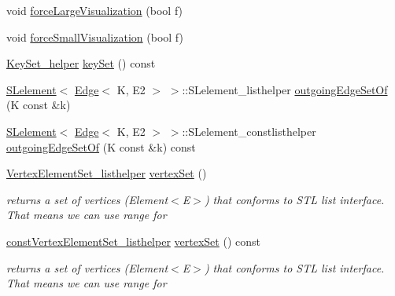 \begin{DoxyCompactItemize}
\item 
void \mbox{\hyperlink{classbridges_1_1datastructure_1_1_graph_adj_list_a6860a0a153fd126ebe8b1bc40d2753a7}{force\+Large\+Visualization}} (bool f)
\item 
void \mbox{\hyperlink{classbridges_1_1datastructure_1_1_graph_adj_list_a9706e3df7d30320b7e7773a6423e4ff7}{force\+Small\+Visualization}} (bool f)
\item 
\mbox{\hyperlink{classbridges_1_1datastructure_1_1_graph_adj_list_1_1_key_set__helper}{Key\+Set\+\_\+helper}} \mbox{\hyperlink{classbridges_1_1datastructure_1_1_graph_adj_list_a0562e8d82499f26ad656a1dfb5f8908e}{key\+Set}} () const
\item 
\mbox{\hyperlink{classbridges_1_1datastructure_1_1_s_lelement}{S\+Lelement}}$<$ \mbox{\hyperlink{classbridges_1_1datastructure_1_1_edge}{Edge}}$<$ K, E2 $>$ $>$\+::S\+Lelement\+\_\+listhelper \mbox{\hyperlink{classbridges_1_1datastructure_1_1_graph_adj_list_ac066da800ab88dc2e55a89650e08bb78}{outgoing\+Edge\+Set\+Of}} (K const \&k)
\item 
\mbox{\hyperlink{classbridges_1_1datastructure_1_1_s_lelement}{S\+Lelement}}$<$ \mbox{\hyperlink{classbridges_1_1datastructure_1_1_edge}{Edge}}$<$ K, E2 $>$ $>$\+::S\+Lelement\+\_\+constlisthelper \mbox{\hyperlink{classbridges_1_1datastructure_1_1_graph_adj_list_ab0677da029442194925f8167cc2b8638}{outgoing\+Edge\+Set\+Of}} (K const \&k) const
\item 
\mbox{\hyperlink{classbridges_1_1datastructure_1_1_graph_adj_list_1_1_vertex_element_set__listhelper}{Vertex\+Element\+Set\+\_\+listhelper}} \mbox{\hyperlink{classbridges_1_1datastructure_1_1_graph_adj_list_a9dcf0bb4a68f3b02281c84e9bb69d6b3}{vertex\+Set}} ()
\begin{DoxyCompactList}\small\item\em returns a set of vertices (Element$<$\+E$>$) that conforms to S\+TL list interface. That means we can use range for \end{DoxyCompactList}\item 
\mbox{\hyperlink{classbridges_1_1datastructure_1_1_graph_adj_list_1_1const_vertex_element_set__listhelper}{const\+Vertex\+Element\+Set\+\_\+listhelper}} \mbox{\hyperlink{classbridges_1_1datastructure_1_1_graph_adj_list_a5ef96f5df21b2f9743b7bb79c10cf090}{vertex\+Set}} () const
\begin{DoxyCompactList}\small\item\em returns a set of vertices (Element$<$\+E$>$) that conforms to S\+TL list interface. That means we can use range for \end{DoxyCompactList}\end{DoxyCompactItemize}


